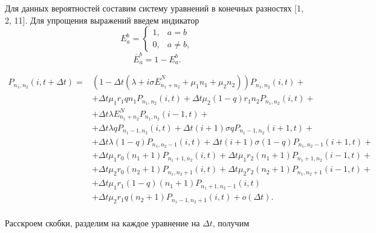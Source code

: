 \hspace*{\parindent}%
Для данных вероятностей составим систему уравнений в конечных разностях [1, 2, 11]. 
Для упрощения выражений введем индикатор
\begin{equation*}
	E_a^b = 
	\begin{cases}
		1, &{a=b}\\
		0, &{a \neq b},
	\end{cases}
\end{equation*}
\begin{equation*}
	\overline{E}_{a}^b = 1 - E_a^b.
\end{equation*}

\begin{equation*}
	\begin{split}	
		P_{n_{1}, n_{2}}(i,t+\Delta t)=&(1-\Delta t(\lambda+i\sigma \overline{E}_{n_{1}+n_{2}}^N+\mu_{1}n_{1}+\mu_{2}n_{2}))P_{n_{1}, n_{2}}(i,t)+\\
		&+\Delta t\mu_{1}r_{1}qn_{1}P_{n_{1}, n_{2}}(i,t)+\Delta t \mu_{2}(1-q)r_{1}n_{2}P_{n_{1}, n_{2}}(i,t)+\\
		&+\Delta t \lambda E_{n_{1}+n_{2}}^N P_{n_{1}, n_{2}}(i-1,t)+\\
		&+\Delta t\lambda qP_{n_{1}-1, n_{2}}(i,t) + \Delta t(i+1) \sigma q P_{n_{1}-1, n_{2}}(i+1,t)+\\
		&+\Delta t\lambda (1-q)P_{n_{1}, n_{2}-1}(i,t) + \Delta t(i+1) \sigma (1-q) P_{n_{1}, n_{2}-1}(i+1,t)+\\
		&+\Delta t \mu_{1} r_{0}(n_{1}+1) P_{n_{1} +1 , n_{2}}(i,t) + \Delta t \mu_{1} r_{2} (n_{1}+1) P_{n_{1} + 1, n_{2}}(i-1,t)+\\
		&+\Delta t \mu_{2} r_{0}(n_{2}+1) P_{n_{1}, n_{2} + 1 }(i,t) + \Delta t\mu_{2} r_{2} (n_{2}+1) P_{n_{1}, n_{2} + 1}(i-1,t)+\\
		&+\Delta t\mu_{1} r_{1}(1-q)(n_{1}+1) P_{n_{1} +1 , n_{2}-1}(i,t)\\
		&+\Delta t\mu_{2} r_{1}q (n_{2}+1)P_{n_{1} -1 , n_{2}+1}(i,t)+o(\Delta t).\\
\end{split}
\end{equation*}

Расскроем скобки, разделим на каждое уравнение на $\Delta t$, получим

